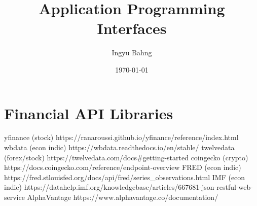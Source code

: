 \documentclass[10pt]{article}
\title{Application Programming Interfaces}
\date{\today}
\author{Ingyu Bahng}
\begin{document}


\section{Financial API Libraries}

yfinance (stock) https://ranaroussi.github.io/yfinance/reference/index.html
wbdata (econ indic) https://wbdata.readthedocs.io/en/stable/
twelvedata (forex/stock) https://twelvedata.com/docs#getting-started
coingecko (crypto) https://docs.coingecko.com/reference/endpoint-overview
FRED (econ indic) https://fred.stlouisfed.org/docs/api/fred/series_observations.html
IMF (econ indic) https://datahelp.imf.org/knowledgebase/articles/667681-json-restful-web-service
AlphaVantage https://www.alphavantage.co/documentation/
 
\end{document}
